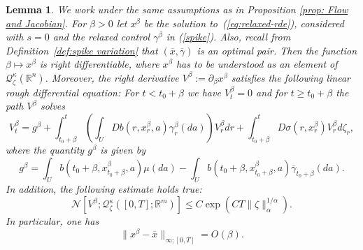 \documentclass[10pt,a4paper]{amsart}
\newtheorem{lemma}{Lemma}
\newcommand{\R}{\mathbb R}
\newcommand{\ga}{\gamma}
\newcommand{\ka}{\kappa}
\newcommand{\lp}{\left(}
\newcommand{\rp}{\right)}
\begin{document}
\begin{lemma} \label{Lemma: X}
We work under the same assumptions as in Proposition \ref{prop: Flow and Jacobian}. 
For $\beta>0$ let $x^{\beta}$ be the solution to~(\ref{eq:relaxed-rde}), considered with $s=0$ and the relaxed control $\gamma^{\beta}$ in (\ref{spike}). Also, recall from Definition~\ref{def:spike variation} that $(\overline{x},\overline{\gamma})$ is an optimal pair. Then the function $\beta\mapsto x^{\beta}$ is right differentiable, where $x^{\beta}$ has to be understood as an element of $\mathcal{Q}_{\zeta}^{\kappa}(\R^n)$. Moreover, the right derivative $V^{\beta}:= \partial_{\beta}x^{\beta}$ satisfies the following linear rough differential equation: For $t<t_{0}+\beta$ we have $V^{\beta}_{t}=0$ and for $t\geq t_{0}+\beta$ the path $V^{\beta}$ solves 
\begin{equation} \label{eq: RDE for derivative}
V^{\beta}_{t}=g^{\beta}+\int_{t_{0}+\beta}^{t}\lp\int_{U}Db(r,x_{r}^{\beta},a)\ga_{r}^{\beta}(da)\rp V_{r}^{\beta}dr +\int_{t_{0}+\beta}^{t}D\sigma(r,x_{r}^{\beta})V_{r}^{\beta}d\zeta_{r},
\end{equation}
where the quantity $g^{\beta}$ is given by
\begin{equation} \label{eq: g-beta}
g^{\beta}=\int_{U}b(t_{0}+\beta,x^{\beta}_{t_{0}+\beta},a)\mu(da)-\int_{U}b(t_{0}+\beta,x^{\beta}_{t_{0}+\beta},a)\overline{\ga}_{t_{0}+\beta}(da). 
\end{equation}
In addition, the following estimate holds true:
\begin{equation} \label{Ineq: derivative_of_dynamics}
\mathcal{N}\left[V^{\beta};\mathcal{Q}_{\zeta}^{\ka}([0,T];\R^m)\right]\leq C\exp\lp CT\|\zeta\|_{\alpha}^{1/\alpha} \rp .
\end{equation}
In particular, one has
\begin{equation}\|x^{\beta}-\overline{x}\|_{\infty;[0,T]}=O(\beta) .
\label{eq: Pontry-1}\end{equation}
        \end{lemma}
\end{document}
